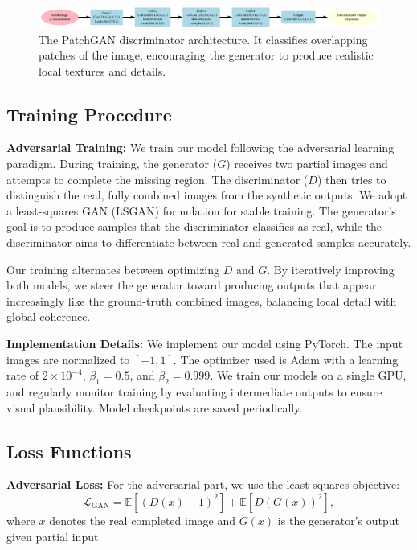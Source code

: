 \documentclass[sigconf]{acmart}
\begin{document}
\begin{figure}[h!]
    \centering
    \includegraphics[width=\linewidth]{images/discriminator.pdf}
    \caption{The PatchGAN discriminator architecture. It classifies overlapping patches of the image, encouraging the generator to produce realistic local textures and details.}
    \label{fig:discriminator}
\end{figure}

\subsection*{Training Procedure}

\noindent\textbf{Adversarial Training:}  
We train our model following the adversarial learning paradigm. During training, the generator ($G$) receives two partial images and attempts to complete the missing region. The discriminator ($D$) then tries to distinguish the real, fully combined images from the synthetic outputs. We adopt a least-squares GAN (LSGAN) formulation \cite{Mao2017} for stable training. The generator’s goal is to produce samples that the discriminator classifies as real, while the discriminator aims to differentiate between real and generated samples accurately.

Our training alternates between optimizing $D$ and $G$. By iteratively improving both models, we steer the generator toward producing outputs that appear increasingly like the ground-truth combined images, balancing local detail with global coherence.

\noindent\textbf{Implementation Details:}  
We implement our model using PyTorch. The input images are normalized to $[-1, 1]$. The optimizer used is Adam \cite{Kingma2015} with a learning rate of $2 \times 10^{-4}$, $\beta_1 = 0.5$, and $\beta_2 = 0.999$. We train our models on a single GPU, and regularly monitor training by evaluating intermediate outputs to ensure visual plausibility. Model checkpoints are saved periodically.

\subsection*{Loss Functions}

\noindent\textbf{Adversarial Loss:}  
For the adversarial part, we use the least-squares objective:
\[
\mathcal{L}_{\text{GAN}} = \mathbb{E}[(D(x)-1)^2] + \mathbb{E}[D(G(x))^2],
\]
where $x$ denotes the real completed image and $G(x)$ is the generator’s output given partial input.
\end{document}
